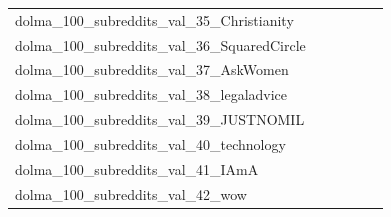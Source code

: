 \documentclass[dvipsnames]{article}
\begin{document}
\begin{appendix}
{\begin{longtable}{m{6cm}m{1.7cm}m{1.7cm}m{1.7cm}m{1.7cm}m{1.7cm}}
	dolma\_100\_subreddits\_val\_35\_Christianity  & \colorbox[HTML]{ffffe5}{\makebox[\mywidth][c]{17.88}} & \colorbox[HTML]{b7e193}{\makebox[\mywidth][c]{17.02}} & \colorbox[HTML]{ffffe5}{\makebox[\mywidth][c]{18.10}} & \colorbox[HTML]{c2e698}{\makebox[\mywidth][c]{17.04}} & \colorbox[HTML]{77c578}{\makebox[\mywidth][c]{16.94}}\\
	dolma\_100\_subreddits\_val\_36\_SquaredCircle  & \colorbox[HTML]{ffffe5}{\makebox[\mywidth][c]{25.87}} & \colorbox[HTML]{e0f2a8}{\makebox[\mywidth][c]{24.31}} & \colorbox[HTML]{ffffe5}{\makebox[\mywidth][c]{25.83}} & \colorbox[HTML]{e5f5ac}{\makebox[\mywidth][c]{24.34}} & \colorbox[HTML]{77c578}{\makebox[\mywidth][c]{24.03}}\\
	dolma\_100\_subreddits\_val\_37\_AskWomen  & \colorbox[HTML]{ffffe5}{\makebox[\mywidth][c]{17.72}} & \colorbox[HTML]{bee496}{\makebox[\mywidth][c]{16.81}} & \colorbox[HTML]{ffffe5}{\makebox[\mywidth][c]{17.77}} & \colorbox[HTML]{d3eda0}{\makebox[\mywidth][c]{16.85}} & \colorbox[HTML]{77c578}{\makebox[\mywidth][c]{16.72}}\\
	dolma\_100\_subreddits\_val\_38\_legaladvice  & \colorbox[HTML]{ffffe5}{\makebox[\mywidth][c]{18.66}} & \colorbox[HTML]{c3e698}{\makebox[\mywidth][c]{17.75}} & \colorbox[HTML]{ffffe5}{\makebox[\mywidth][c]{18.92}} & \colorbox[HTML]{bfe596}{\makebox[\mywidth][c]{17.74}} & \colorbox[HTML]{77c578}{\makebox[\mywidth][c]{17.64}}\\
	dolma\_100\_subreddits\_val\_39\_JUSTNOMIL  & \colorbox[HTML]{ffffe5}{\makebox[\mywidth][c]{24.25}} & \colorbox[HTML]{bbe395}{\makebox[\mywidth][c]{23.16}} & \colorbox[HTML]{ffffe5}{\makebox[\mywidth][c]{24.86}} & \colorbox[HTML]{e4f4ab}{\makebox[\mywidth][c]{23.32}} & \colorbox[HTML]{77c578}{\makebox[\mywidth][c]{23.02}}\\
	dolma\_100\_subreddits\_val\_40\_technology  & \colorbox[HTML]{ffffe5}{\makebox[\mywidth][c]{23.39}} & \colorbox[HTML]{c3e698}{\makebox[\mywidth][c]{22.09}} & \colorbox[HTML]{ffffe5}{\makebox[\mywidth][c]{23.52}} & \colorbox[HTML]{e4f4ab}{\makebox[\mywidth][c]{22.21}} & \colorbox[HTML]{77c578}{\makebox[\mywidth][c]{21.95}}\\
	dolma\_100\_subreddits\_val\_41\_IAmA  & \colorbox[HTML]{ffffe5}{\makebox[\mywidth][c]{19.83}} & \colorbox[HTML]{f0f9b4}{\makebox[\mywidth][c]{18.83}} & \colorbox[HTML]{ffffe5}{\makebox[\mywidth][c]{19.86}} & \colorbox[HTML]{d1ec9f}{\makebox[\mywidth][c]{18.71}} & \colorbox[HTML]{77c578}{\makebox[\mywidth][c]{18.56}}\\
	dolma\_100\_subreddits\_val\_42\_wow  & \colorbox[HTML]{ffffe5}{\makebox[\mywidth][c]{31.26}} & \colorbox[HTML]{e4f4ab}{\makebox[\mywidth][c]{29.25}} & \colorbox[HTML]{ffffe5}{\makebox[\mywidth][c]{31.44}} & \colorbox[HTML]{f2fab5}{\makebox[\mywidth][c]{29.39}} & \colorbox[HTML]{77c578}{\makebox[\mywidth][c]{28.82}}\\

\end{longtable}}
\end{appendix}
\end{document}
